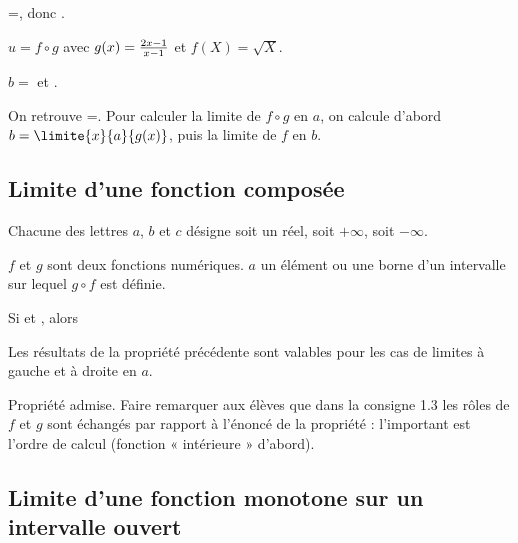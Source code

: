 \begin{corrigeprof}[10]
\be
\item {}=, donc .
\item \be \item $u=f\circ g$ avec $g(x)=\frac{2x-1}{x-1}$ et $f(X)=\sqrt{X}$.
	\item $b=$ et .
	\item On retrouve =. Pour calculer la limite de $f\circ g$ en $a$, on calcule d'abord $b=\limite{x}{a}{g(x)}$, puis la limite de $f$ en $b$.\ee
\ee
\end{corrigeprof}
\ifenseignant %
\subsection{Limite d'une fonction composée}
Chacune des lettres $a$, $b$ et $c$ désigne soit un réel, soit $+\infty$, soit $-\infty$.\\
\begin{propriete}
	$f$ et $g$ sont deux fonctions numériques. $a$ un élément ou une borne d’un intervalle sur lequel $g\circ f$ est
	définie.
	\par Si  et , alors 
\end{propriete}
\par Les résultats de la propriété précédente sont valables pour les cas de limites à gauche et à droite en $a$.
\begin{noteprof}
Propriété admise. Faire remarquer aux élèves que dans la consigne 1.3 les rôles de $f$ et $g$ sont échangés par rapport à l'énoncé de la propriété : l'important est l'ordre de calcul (fonction « intérieure » d'abord).
\end{noteprof}
 \subsection{Limite d'une fonction monotone sur un intervalle ouvert}
